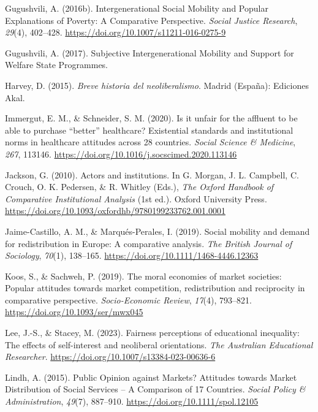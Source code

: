 \documentclass[
  12pt,
]{article}
\newlength{\cslhangindent}
\newenvironment{CSLReferences}[2] %
 {\begin{list}{}{%
  \setlength{\itemindent}{0pt}
  \setlength{\leftmargin}{0pt}
  \setlength{\parsep}{0pt}
  \ifodd #1
   \setlength{\leftmargin}{\cslhangindent}
   \setlength{\itemindent}{-1\cslhangindent}
  \fi
  \setlength{\itemsep}{#2\baselineskip}}}
 {\end{list}}
\begin{document}
\begin{CSLReferences}{1}{0}
Gugushvili, A. (2016b). Intergenerational {Social Mobility} and {Popular
Explanations} of {Poverty}: {A Comparative Perspective}. \emph{Social
Justice Research}, \emph{29}(4), 402--428.
\url{https://doi.org/10.1007/s11211-016-0275-9}

Gugushvili, A. (2017). Subjective {Intergenerational Mobility} and
{Support} for {Welfare State Programmes}.

Harvey, D. (2015). \emph{{Breve historia del neoliberalismo}}. Madrid
(Espa{ñ}a): Ediciones Akal.

Immergut, E. M., \& Schneider, S. M. (2020). Is it unfair for the
affluent to be able to purchase {``better''} healthcare? {Existential}
standards and institutional norms in healthcare attitudes across 28
countries. \emph{Social Science \& Medicine}, \emph{267}, 113146.
\url{https://doi.org/10.1016/j.socscimed.2020.113146}

Jackson, G. (2010). Actors and institutions. In G. Morgan, J. L.
Campbell, C. Crouch, O. K. Pedersen, \& R. Whitley (Eds.), \emph{The
{Oxford Handbook} of {Comparative Institutional Analysis}} (1st ed.).
Oxford University Press.
\url{https://doi.org/10.1093/oxfordhb/9780199233762.001.0001}

Jaime-Castillo, A. M., \& Marqués-Perales, I. (2019). Social mobility
and demand for redistribution in {Europe}: A comparative analysis.
\emph{The British Journal of Sociology}, \emph{70}(1), 138--165.
\url{https://doi.org/10.1111/1468-4446.12363}

Koos, S., \& Sachweh, P. (2019). The moral economies of market
societies: Popular attitudes towards market competition, redistribution
and reciprocity in comparative perspective. \emph{Socio-Economic
Review}, \emph{17}(4), 793--821.
\url{https://doi.org/10.1093/ser/mwx045}

Lee, J.-S., \& Stacey, M. (2023). Fairness perceptions of educational
inequality: The effects of self-interest and neoliberal orientations.
\emph{The Australian Educational Researcher}.
\url{https://doi.org/10.1007/s13384-023-00636-6}

Lindh, A. (2015). Public {Opinion} against {Markets}? {Attitudes}
towards {Market Distribution} of {Social Services} -- {A Comparison} of
17 {Countries}. \emph{Social Policy \& Administration}, \emph{49}(7),
887--910. \url{https://doi.org/10.1111/spol.12105}


\end{CSLReferences}
\end{document}
